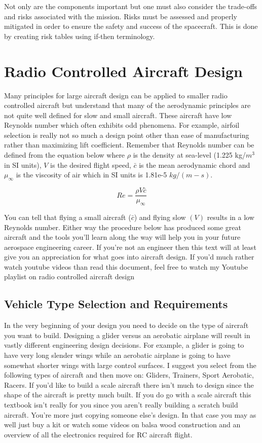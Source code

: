 \documentclass{article}
\begin{document}
Not only are the components important but one must also consider the
trade-offs and risks associated with the mission. Risks must be
assessed and properly mitigated in order to ensure the safety and
success of the spacecraft. This is done by creating risk tables using
if-then terminology.

\section{Radio Controlled Aircraft Design}

Many principles for large aircraft design can be applied to smaller
radio controlled aircraft but understand that many of the aerodynamic
principles are not quite well defined for slow and small
aircraft. These aircraft have low Reynolds number which often exhibits
odd phenomena. For example, airfoil selection is really not so much a
design point other than ease of manufacturing rather than maximizing
lift coefficient. Remember that Reynolds number can be defined from
the equation below where $\rho$ is the density at sea-level (1.225
kg/$m^3$ in SI units), $V$ is
the desired flight speed, $\bar{c}$ is the mean aerodynamic chord and
$\mu_{\infty}$ is the viscosity of air which in SI units is 1.81e-5
$kg/(m-s)$. 

\begin{equation}
Re = \frac{\rho V \bar{c}}{\mu_{\infty}}
\end{equation}

You can tell that flying a small aircraft ($\bar{c}$) and flying slow
$(V)$ results in a low Reynolds number. Either way the procedure below
has produced some great aircraft and the tools you'll learn along the
way will help you in your future aerospace engineering career. If
you're not an engineer then this text will at least give you an
appreciation for what goes into aircraft design. If you'd much rather
watch youtube videos than read this document, feel free to watch my
Youtube playlist on radio controlled aircraft design\cite{RCYoutube}

\subsection{Vehicle Type Selection and Requirements}

In the very beginning of your design you need to decide on the type of
aircraft you want to build. Designing a glider versus an aerobatic
airplane will result in vastly different engineering design
decisions. For example, a glider is going to have very long slender
wings while an aerobatic airplane is going to have somewhat shorter
wings with large control surfaces. I suggest you select from the
following types of aircraft and then move on: Gliders, Trainers, Sport
Aerobatic, Racers. If you'd like to build a scale aircraft there isn't
much to design since the shape of the aircraft is pretty much
built. If you do go with a scale aircraft this textbook isn't really
for you since you aren't really building a scratch build
aircraft. You're more just copying someone else's design. In that case
you may as well just buy a kit or watch some videos on balsa wood
construction and an overview of all the electronics required for RC
aircraft flight.
\end{document}
